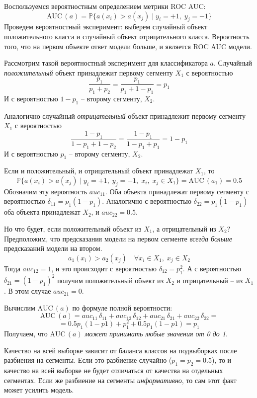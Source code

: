 \documentclass[12pt,fleqn]{article}
\begin{document}
    \begin{esSolution}
        Воспользуемся вероятностным определением метрики ROC AUC:
        \[
            \text{AUC}\,(a) = \mathbb P \big \{ a(x_i) > a(x_j)\; |\; y_i = +1,\; y_j = -1 \big \}
            \]
        Проведем вероятностный эксперимент: выберем случайный объект положительного класса и случайный объект
        отрицательного класса. Вероятность того, что на первом объекте ответ модели больше, и является
        ROC AUC модели.
        
        Рассмотрим такой вероятностный эксперимент для классификатора \( a \). Случайный \textit{положительный}
        объект принадлежит первому сегменту \( X_1 \) с вероятностью 
        \[
            \frac{p_1}{p_1 + p_2} = \frac{p_1}{p_1 + 1 - p_1} = p_1
            \]
        И с вероятностью \( 1 - p_1 \) – второму сегменту, \( X_2 \).
        
        Аналогично случайный \textit{отрицательный} объект принадлежит первому сегменту \( X_1 \) с вероятностью 
        \[
            \frac{1 - p_1}{1 - p_1 + 1 - p_2} = \frac{1 - p_1}{1 - p_1 +  p_1} = 1 - p_1
            \]
        И с вероятностью \( p_1 \) – второму сегменту, \( X_2 \).
        
        Если и положительный, и отрицательный объект принадлежат \( X_1 \), то
        \[
            \mathbb P \big \{ a(x_i) > a(x_j)\; |\; y_i = +1,\; y_j = -1,\; x_i,\; x_j \in X_1  \big \}
            = \text{AUC}\,(a_1) = 0.5
            \]
        Обозначим эту вероятность \( auc_{11} \). Оба объекта принадлежат первому сегменту
        с вероятностью \( \delta_{11} = p_1 (1 - p_1) \). Аналогично с вероятностью
        \( \delta_{22} = p_1 (1 - p_1) \)
        оба объекта принадлежат \( X_2 \), и \( auc_{22}=0.5 \).
        
        Но что будет, если положительный объект из \( X_1 \), а отрицательный из \( X_2 \)? Предположим, что
        предсказания модели на первом сегменте \textit{всегда больше} предсказаний модели на втором.
        \[
            a_1(x_i) > a_2(x_j)\quad \forall x_i \in X_1,\; x_j \in X_2
            \]
        Тогда \( auc_{12} = 1 \), и это происходит с вероятностью \( \delta_{12} = p_1 ^ 2 \). А с вероятностью
        \( \delta_{21} = (1 - p_1) ^ 2\) получим положительный объект из \( X_2 \) и отрицательный – из \( X_1 \).
        В этом случае \( auc_{21} = 0 \). 
        
        Вычислим \( \text{AUC}\,(a) \) по формуле полной вероятности:
        \[
            \text{AUC}\,(a) = auc_{11}\,\delta_{11} + auc_{12}\,\delta_{12} +
                                        auc_{21}\,\delta_{21} + auc_{22}\,\delta_{22} =
            \]
        \[
            =0.5p_1(1 - p1) + p_1^2 + 0.5p_1(1 - p1) = p_1
            \]
        Получаем, что \( \text{AUC}\,(a) \) \textit{может принимать любые значения от 0 до 1}.
        
        Качество на всей выборке зависит от
        баланса классов на подвыборках после разбиения на сегменты. Если это разбиение случайно
        (\(p_1 = p_2 = 0.5\)), то и качество на всей выборке не будет отличаться от качества на
        отдельных сегментах. Если же разбиение на сегменты \textit{информативно}, то сам этот
        факт может усилить модель.
    \end{esSolution}
\end{document}
